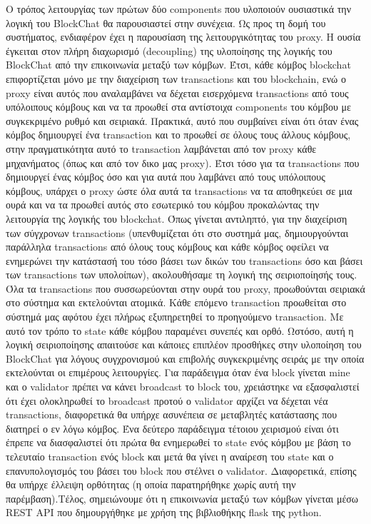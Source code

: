 \documentclass[12pt, a4paper]{article}
\begin{document}
	Ο τρόπος λειτουργίας των πρώτων δύο components που υλοποιούν ουσιαστικά την λογική του BlockChat θα παρουσιαστεί στην συνέχεια. Ως προς τη δομή του συστήματος, ενδιαφέρον έχει η παρουσίαση της λειτουργικότητας του proxy. Η ουσία έγκειται στον πλήρη διαχωρισμό (decoupling) της υλοποίησης της λογικής του BlockChat από την επικοινωνία μεταξύ των κόμβων. Έτσι, κάθε κόμβος blockchat επιφορτίζεται μόνο με την διαχείριση των transactions και του blockchain, ενώ ο proxy είναι αυτός που αναλαμβάνει να δέχεται εισερχόμενα transactions από τους υπόλοιπους κόμβους και να τα προωθεί στα αντίστοιχα components του κόμβου με συγκεκριμένο ρυθμό και σειριακά. Πρακτικά, αυτό που συμβαίνει είναι ότι όταν ένας κόμβος δημιουργεί ένα transaction και το προωθεί σε όλους τους άλλους κόμβους, στην πραγματικότητα αυτό το transaction λαμβάνεται από τον proxy κάθε μηχανήματος (όπως και από τον δικο μας proxy). Έτσι τόσο για τα transactions που δημιουργεί ένας κόμβος όσο και για αυτά που λαμβάνει από τους υπόλοιπους κόμβους, υπάρχει ο proxy ώστε όλα αυτά τα transactions να τα αποθηκεύει σε μια ουρά και να τα προωθεί αυτός στο εσωτερικό του κόμβου προκαλώντας την λειτουργία της λογικής του blockchat. Όπως γίνεται αντιληπτό, για την διαχείριση των σύγχρονων transactions (υπενθυμίζεται ότι στο συστημά μας, δημιουργούνται παράλληλα transactions από όλους τους κόμβους και κάθε κόμβος οφείλει να ενημερώνει την κατάστασή του τόσο βάσει των δικών του transactions όσο και βάσει των transactions των υπολοίπων), ακολουθήσαμε τη λογική της σειριοποίησής τους. Όλα τα transactions που συσσωρεύονται στην ουρά του proxy, προωθούνται σειριακά στο σύστημα και εκτελούνται ατομικά. Κάθε επόμενο transaction προωθείται στο σύστημά μας αφότου έχει πλήρως εξυπηρετηθεί το προηγούμενο transaction. Με αυτό τον τρόπο το state κάθε κόμβου παραμένει συνεπές και ορθό. Ωστόσο, αυτή η λογική σειριοποίησης απαιτούσε και κάποιες επιπλέον προσθήκες στην υλοποίηση του BlockChat για λόγους συγχρονισμού και επιβολής συγκεκριμένης σειράς με την οποία εκτελούνται οι επιμέρους λειτουργίες. Για παράδειγμα όταν ένα block γίνεται mine και ο validator πρέπει να κάνει broadcast το block του, χρειάστηκε να εξασφαλιστεί ότι έχει ολοκληρωθεί το broadcast προτού ο validator αρχίζει να δέχεται νέα transactions, διαφορετικά θα υπήρχε ασυνέπεια σε μεταβλητές κατάστασης που διατηρεί ο εν λόγω κόμβος. Ένα δεύτερο παράδειγμα τέτοιου χειρισμού είναι ότι έπρεπε να διασφαλιστεί ότι πρώτα θα ενημερωθεί το state ενός κόμβου με βάση το τελευταίο transaction ενός block και μετά θα γίνει η αναίρεση του state και ο επανυπολογισμός του βάσει του block που στέλνει ο validator. Διαφορετικά, επίσης θα υπήρχε έλλειψη ορθότητας (η οποία παρατηρήθηκε χωρίς αυτή την παρέμβαση).Τέλος, σημειώνουμε ότι η επικοινωνία μεταξύ των κόμβων γίνεται μέσω REST API που δημουργήθηκε με χρήση της βιβλιοθήκης flask της python.
\end{document}
